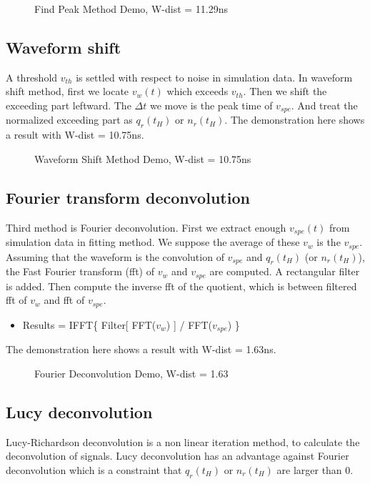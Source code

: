 \begin{figure}[H]
    \centering
    \scalebox{0.4}{}
    \caption{Find Peak Method Demo, W-dist = 11.29ns}
\end{figure}

\subsection{Waveform shift}
A threshold $v_{th}$ is settled with respect to noise in simulation data. In waveform shift method, first we locate $v_{w}(t)$ which exceeds $v_{th}$. Then we shift the exceeding part leftward. The $\Delta t$ we move is the peak time of $v_{spe}$. And treat the normalized exceeding part as $q_{r}(t_{H})$ or $n_{r}(t_{H})$. The demonstration here shows a result with W-dist = 10.75ns. 

\begin{figure}[H]
    \centering
    \scalebox{0.4}{}
    \caption{Waveform Shift Method Demo, W-dist = 10.75ns}
\end{figure}

\subsection{Fourier transform deconvolution}
Third method is Fourier deconvolution. First we extract enough $v_{spe}(t)$ from simulation data in fitting method. We suppose the average of these $v_{w}$ is the $v_{spe}$. Assuming that the waveform is the convolution of $v_{spe}$ and $q_{r}(t_{H})$ (or $n_{r}(t_{H})$), the Fast Fourier transform (fft) of $v_{w}$ and $v_{spe}$ are computed. A rectangular filter is added. Then compute the inverse fft of the quotient, which is between filtered fft of $v_{w}$ and fft of $v_{spe}$. 

\begin{itemize}
    \item Results = IFFT\{ Filter[ FFT($v_{w}$) ] / FFT($v_{spe}$) \}
\end{itemize}

The demonstration here shows a result with W-dist = 1.63ns. 

\begin{figure}[H]
    \centering
    \scalebox{0.4}{}
    \caption{Fourier Deconvolution Demo, W-dist = 1.63}
\end{figure}

\subsection{Lucy deconvolution}
Lucy-Richardson deconvolution is a non linear iteration method, to calculate the deconvolution of signals. Lucy deconvolution has an advantage against Fourier deconvolution which is a constraint that $q_{r}(t_{H})$ or $n_{r}(t_{H})$ are larger than 0. 

